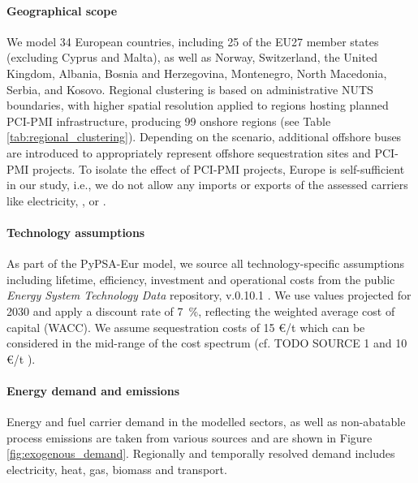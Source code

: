 \documentclass[final,5p,times,twocolumn,sort&compress]{elsarticle}
\begin{document}
\paragraph{Geographical scope} 
\label{sec:geographical_scope}
We model 34 European countries, including 25 of the EU27 member states (excluding Cyprus and Malta), as well as Norway, Switzerland, the United Kingdom, Albania, Bosnia and Herzegovina, Montenegro, North Macedonia, Serbia, and Kosovo. Regional clustering is based on administrative NUTS boundaries, with higher spatial resolution applied to regions hosting planned PCI-PMI infrastructure, producing 99 onshore regions (see Table \ref{tab:regional_clustering}). Depending on the scenario, additional offshore buses are introduced to appropriately represent offshore sequestration sites and PCI-PMI projects. To isolate the effect of PCI-PMI projects, Europe is self-sufficient in our study, i.e., we do not allow any imports or exports of the assessed carriers like electricity, , or . 

\paragraph{Technology assumptions} 
\label{sec:technology_assumptions}
As part of the PyPSA-Eur model, we source all technology-specific assumptions including lifetime, efficiency, investment and operational costs from the public \textit{Energy System Technology Data} repository, v.0.10.1 \cite{zeyenPyPSATechnologydataV01012025}. We use values projected for 2030 and apply a discount rate of \SI{7}{\percent}, reflecting the weighted average cost of capital (WACC). We assume  sequestration costs of 15 \euro{}/t which can be considered in the mid-range of the cost spectrum (cf. TODO SOURCE 1 and 10 \euro{}/t \cite{hofmannH2CO2Network2025}).

\paragraph{Energy demand and  emissions}
\label{sec:energy_demand_and_co2_emissions}
Energy and fuel carrier demand in the modelled sectors, as well as non-abatable  process emissions are taken from various sources \cite{mantzosJRCIDEES20152018,eurostatCompleteEnergyBalances2022,manzGeoreferencedIndustrialSites2018,muehlenpfordtTimeSeries2019,krienOemofDemandlibV0222025} and are shown in Figure \ref{fig:exogenous_demand}. Regionally and temporally resolved demand includes electricity, heat, gas, biomass and transport. 
\end{document}

